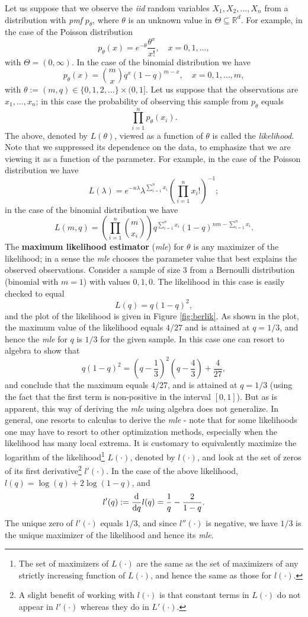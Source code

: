 \documentclass[]{book}
\let\rmarkdownfootnote\footnote%
\def\footnote{\protect\rmarkdownfootnote}
\theoremstyle{definition}
\theoremstyle{definition}
\theoremstyle{definition}
\theoremstyle{remark}
\begin{document}
Let us suppose that we observe the \emph{iid} random variables
\(X_1,X_2,\ldots,X_n\) from a distribution with \emph{pmf} \(p_\theta\),
where \(\theta\) is an unknown value in
\(\Theta\subseteq \mathbb{R}^d\). For example, in the case of the
Poisson distribution \[
p_\theta(x)=e^{-\theta}\frac{\theta^x}{x!}, \quad x=0,1,\ldots,
\] with \(\Theta=(0,\infty)\). In the case of the binomial distribution
we have \[
p_\theta(x)=\binom{m}{x} q^x(1-q)^{m-x}, \quad x=0,1,\ldots,m,
\] with \(\theta:=(m,q)\in \{0,1,2,\ldots\}\times(0,1]\). Let us suppose
that the observations are \(x_1,\ldots,x_n\); in this case the
probability of observing this sample from \(p_\theta\) equals \[
\prod_{i=1}^n p_\theta(x_i).
\] The above, denoted by \(L(\theta)\), viewed as a function of
\(\theta\) is called the \emph{likelihood}. Note that we suppressed its
dependence on the data, to emphasize that we are viewing it as a
function of the parameter. For example, in the case of the Poisson
distribution we have \[
L(\lambda)=e^{-n\lambda} \lambda^{\sum_{i=1}^n x_i} \left(\prod_{i=1}^n x_i!\right)^{-1};
\] in the case of the binomial distribution we have \[
L(m,q)=\left(\prod_{i=1}^n \binom{m}{x_i}\right) q^{\sum_{i=1}^n x_i} (1-q)^{nm-\sum_{i=1}^n x_i} .
\] The \textbf{maximum likelihood estimator} (\emph{mle}) for \(\theta\)
is any maximizer of the likelihood; in a sense the \emph{mle} chooses
the parameter value that best explains the observed observations.
Consider a sample of size \(3\) from a Bernoulli distribution (binomial
with \(m=1\)) with values \(0,1,0\). The likelihood in this case is
easily checked to equal \[
L(q)=q(1-q)^2,
\] and the plot of the likelihood is given in Figure \ref{fig:berlik}.
As shown in the plot, the maximum value of the likelihood equals
\(4/27\) and is attained at \(q=1/3\), and hence the \emph{mle} for
\(q\) is \(1/3\) for the given sample. In this case one can resort to
algebra to show that \[
q(1-q)^2=\left(q-\frac{1}{3}\right)^2\left(q-\frac{4}{3}\right)+\frac{4}{27},
\] and conclude that the maximum equals \(4/27\), and is attained at
\(q=1/3\) (using the fact that the first term is non-positive in the
interval \([0,1]\)). But as is apparent, this way of deriving the
\emph{mle} using algebra does not generalize. In general, one resorts to
calculus to derive the \emph{mle} - note that for some likelihoods one
may have to resort to other optimization methods, especially when the
likelihood has many local extrema. It is customary to equivalently
maximize the logarithm of the likelihood\footnote{The set of maximizers
  of \(L(\cdot)\) are the same as the set of maximizers of any strictly
  increasing function of \(L(\cdot)\), and hence the same as those for
  \(l(\cdot)\).} \(L(\cdot)\), denoted by \(l(\cdot)\), and look at the
set of zeros of its first derivative\footnote{A slight benefit of
  working with \(l(\cdot)\) is that constant terms in \(L(\cdot)\) do
  not appear in \(l'(\cdot)\) whereas they do in \(L'(\cdot)\).}
\(l'(\cdot)\). In the case of the above likelihood,
\(l(q)=\log(q)+2\log(1-q)\), and \[
l'(q):=\frac{\rm d}{{\rm d}q}l(q)=\frac{1}{q}-\frac{2}{1-q}.
\] The unique zero of \(l'(\cdot)\) equals \(1/3\), and since
\(l''(\cdot)\) is negative, we have \(1/3\) is the unique maximizer of
the likelihood and hence its \emph{mle}.
\end{document}
